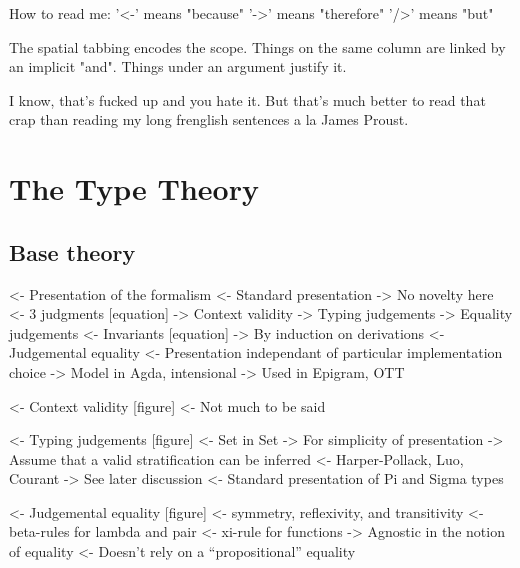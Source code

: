 \documentclass{article}
\newenvironment{structure}{\footnotesize\verbatim}{\endverbatim}
\begin{document}
\begin{structure}
How to read me:
    '<-'  means "because"
    '->'  means "therefore"
    '/>'  means "but"

The spatial tabbing encodes the scope. Things on the same column are
linked by an implicit "and". Things under an argument justify it.

I know, that's fucked up and you hate it. But that's much better to
read that crap than reading my long frenglish sentences a la James
Proust.
\end{structure}

\section{The Type Theory}

\subsection{Base theory}

\begin{structure}
<- Presentation of the formalism
    <- Standard presentation
        -> No novelty here
    <- 3 judgments [equation]
        -> Context validity
        -> Typing judgements
        -> Equality judgements
    <- Invariants [equation]
        -> By induction on derivations
    <- Judgemental equality
        <- Presentation independant of particular implementation choice
        -> Model in Agda, intensional
        -> Used in Epigram, OTT
\end{structure}

\begin{structure}
<- Context validity [figure]
    <- Not much to be said
\end{structure}

\begin{structure}
<- Typing judgements [figure]
    <- Set in Set
        -> For simplicity of presentation
        -> Assume that a valid stratification can be inferred
            <- Harper-Pollack, Luo, Courant
        -> See later discussion
    <- Standard presentation of Pi and Sigma types
\end{structure}

\begin{structure}
<- Judgemental equality [figure]
    <- symmetry, reflexivity, and transitivity
    <- beta-rules for lambda and pair
    <- xi-rule for functions
    -> Agnostic in the notion of equality
        <- Doesn't rely on a ``propositional'' equality
\end{structure}
\end{document}
